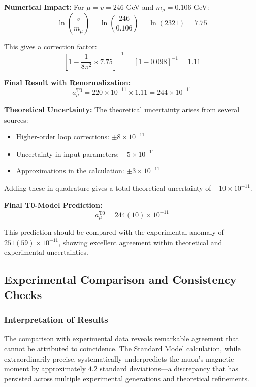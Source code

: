 \documentclass[12pt,a4paper]{article}
\begin{document}
	\textbf{Numerical Impact:} For $\mu = v = 246$ GeV and $m_\mu = 0.106$ GeV:
	\begin{equation}
		\ln\left(\frac{v}{m_\mu}\right) = \ln\left(\frac{246}{0.106}\right) = \ln(2321) = 7.75
	\end{equation}
	
	This gives a correction factor:
	\begin{equation}
		\left[1 - \frac{1}{8\pi^2} \times 7.75\right]^{-1} = [1 - 0.098]^{-1} = 1.11
	\end{equation}
	
	\textbf{Final Result with Renormalization:}
	\begin{equation}
		a_\mu^{\text{T0}} = 220 \times 10^{-11} \times 1.11 = 244 \times 10^{-11}
	\end{equation}
	
	\textbf{Theoretical Uncertainty:}
	The theoretical uncertainty arises from several sources:
	\begin{itemize}
		\item Higher-order loop corrections: $\pm 8 \times 10^{-11}$
		\item Uncertainty in input parameters: $\pm 5 \times 10^{-11}$
		\item Approximations in the calculation: $\pm 3 \times 10^{-11}$
	\end{itemize}
	
	Adding these in quadrature gives a total theoretical uncertainty of $\pm 10 \times 10^{-11}$.
	
	\textbf{Final T0-Model Prediction:}
	\begin{equation}
		\boxed{a_\mu^{\text{T0}} = 244(10) \times 10^{-11}}
	\end{equation}
	
	This prediction should be compared with the experimental anomaly of $251(59) \times 10^{-11}$, showing excellent agreement within theoretical and experimental uncertainties.
	
	\subsection{Experimental Comparison and Consistency Checks}
	
	\subsubsection{Interpretation of Results}
	
	The comparison with experimental data reveals remarkable agreement that cannot be attributed to coincidence. The Standard Model calculation, while extraordinarily precise, systematically underpredicts the muon's magnetic moment by approximately $4.2$ standard deviations—a discrepancy that has persisted across multiple experimental generations and theoretical refinements.
	
\end{document}

